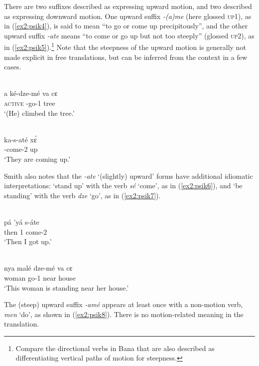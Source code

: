 There are two suffixes described as expressing upward motion, and two described as expressing downward motion. One upward suffix \textit{-(a)me} (here glossed \textsc{up1}), as in (\ref{ex2:psik4}), is said to mean ``to go or come up precipitously'', and the other upward suffix \textit{-ate} means ``to come or go up but not too steeply'' (glossed \textsc{up2}), as in (\ref{ex2:psik5}).\footnote{Compare the directional verbs in Bana that are also described as differentiating vertical paths of motion for steepness.} Note that the steepness of the upward motion is generally not made explicit in free translations, but can be inferred from the context in a few cases.

\ea\label{ex2:psik4}
 \\
\gll  a ké-dze-mé va cɛ	\\
\textsc{active} -go-1 tree	\\
\glt `(He) climbed the tree.'

\ex\label{ex2:psik5}
 \\
\gll ka-s-até xɛ́ \\
-come-2 up \\
\glt `They are coming up.'
\z

Smith also notes that the \textit{-ate} `(slightly) upward' forms have additional idiomatic interpretations: `stand up' with the verb \textit{sé} `come', as in (\ref{ex2:psik6}), and  `be standing' with the verb \textit{dze} `go', as in (\ref{ex2:psik7}).

\ea\label{ex2:psik6}
 \\
\gll pá 'yá s-áte \\
then 1 come-2 \\
\glt `Then I got up.'

\ex\label{ex2:psik7}
 \\
\gll nya malé dze-mé va cɛ \\
 woman go-1 near house \\
\glt `This woman is standing near her house.'
\z

The (steep) upward suffix \textit{-amé} appears at least once with a non-motion verb, \textit{men} `do', as shown in (\ref{ex2:psik8}). There is no motion-related meaning in the translation.

